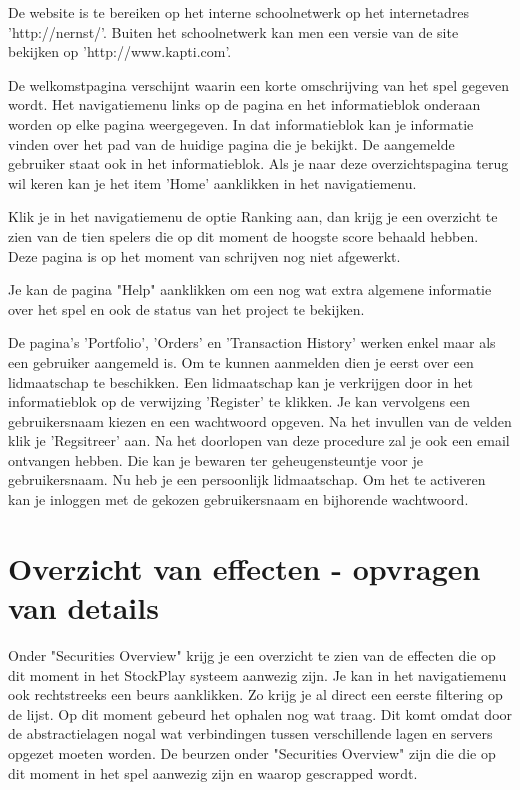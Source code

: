 De website is te bereiken op het interne schoolnetwerk op het internetadres 'http://nernst/'.
Buiten het schoolnetwerk kan men een versie van de site bekijken op 'http://www.kapti.com'.

De welkomstpagina verschijnt waarin een korte omschrijving van het spel gegeven wordt. Het navigatiemenu links op de pagina en het informatieblok onderaan worden op elke pagina weergegeven. In dat informatieblok kan je informatie vinden over het pad van de huidige pagina die je bekijkt. De aangemelde gebruiker staat ook in het informatieblok. Als je naar deze overzichtspagina terug wil keren kan je het item 'Home' aanklikken in het navigatiemenu.

Klik je in het navigatiemenu de optie Ranking aan, dan krijg je een overzicht te zien van de tien spelers die op dit moment de hoogste score behaald hebben.
Deze pagina is op het moment van schrijven nog niet afgewerkt.

Je kan de pagina "Help" aanklikken om een nog wat extra algemene informatie over het spel en ook de status van het project te bekijken.

De pagina's 'Portfolio', 'Orders' en 'Transaction History' werken enkel maar als een gebruiker aangemeld is.
Om te kunnen aanmelden dien je eerst over een lidmaatschap te beschikken. Een lidmaatschap kan je verkrijgen door in het informatieblok op de verwijzing 'Register' te klikken. Je kan vervolgens een gebruikersnaam kiezen en een wachtwoord opgeven. Na het invullen van de velden klik je 'Regsitreer' aan.
Na het doorlopen van deze procedure zal je ook een email ontvangen hebben. Die kan je bewaren ter geheugensteuntje voor je gebruikersnaam.
Nu heb je een persoonlijk lidmaatschap. Om het te activeren kan je inloggen met de gekozen gebruikersnaam en bijhorende wachtwoord.

\section{Overzicht van effecten - opvragen van details}

Onder "Securities Overview" krijg je een overzicht te zien van de effecten die op dit moment in het StockPlay systeem aanwezig zijn. Je kan in het navigatiemenu ook rechtstreeks een beurs aanklikken. Zo krijg je al direct een eerste filtering op de lijst.
Op dit moment gebeurd het ophalen nog wat traag. Dit komt omdat door de abstractielagen nogal wat verbindingen tussen verschillende lagen en servers opgezet moeten worden.
De beurzen onder "Securities Overview" zijn die die op dit moment in het spel aanwezig zijn en waarop gescrapped wordt.

